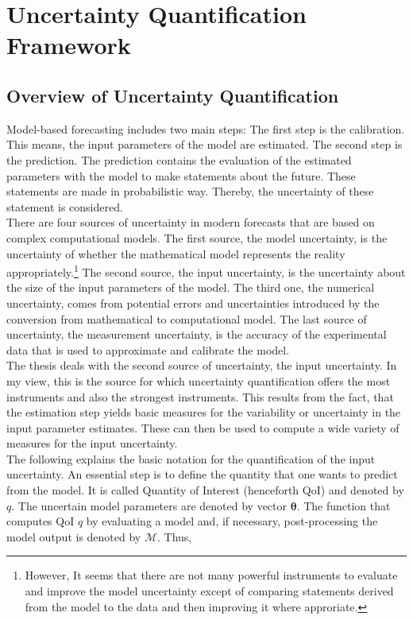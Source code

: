\newpage

\section{Uncertainty Quantification Framework}
\thispagestyle{plain} %

\subsection{Overview of Uncertainty Quantification}
Model-based forecasting includes two main steps: The first step is the calibration. This means, the input parameters of the model are estimated. The second step is the prediction. The prediction contains the evaluation of the estimated parameters with the model to make statements about the future. These statements are made in probabilistic way. Thereby, the uncertainty of these statement is considered.\\
\newline
There are four sources of uncertainty in modern forecasts that are based on complex computational models. The first source, the model uncertainty, is the uncertainty of whether the mathematical model represents the reality appropriately.\footnote{However, It seems that there are not many powerful instruments to evaluate and improve the model uncertainty except of comparing statements derived from the model to the data and then improving it where approriate.} The second source, the input uncertainty, is the uncertainty about the size of the input parameters of the model. The third one, the numerical uncertainty, comes from potential errors and uncertainties introduced by the conversion from mathematical to computational model. The last source of uncertainty, the measurement uncertainty, is the accuracy of the experimental data that is used to approximate and calibrate the model.\\
\newline
The thesis deals with the second source of uncertainty, the input uncertainty. In my view, this is the source for which uncertainty quantification offers the most instruments and also the strongest instruments. This results from the fact, that the estimation step yields basic measures for the variability or uncertainty in the input parameter estimates. These can then be used to compute a wide variety of measures for the input uncertainty.\\
\newline
The following explains the basic notation for the quantification of the input uncertainty. An essential step is to define the quantity that one wants to predict from the model. It is called Quantity of Interest (henceforth QoI) and denoted by $q$. The uncertain model parameters are denoted by vector $\pmb{\theta}$. The function that computes QoI $q$ by evaluating a model and, if necessary, post-processing the model output is denoted by $\mathcal{M}$. Thus,
